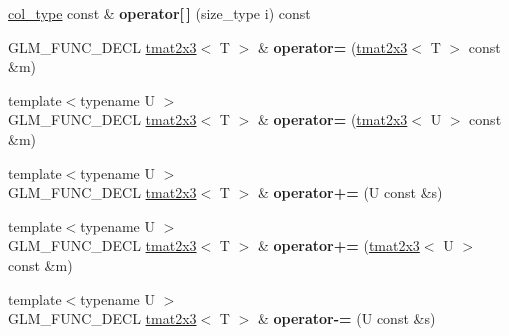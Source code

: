 \begin{DoxyCompactItemize}
\item 
\hypertarget{structglm_1_1detail_1_1tmat2x3_a1008ba45200ec07a341cda897e150d78}{\hyperlink{structglm_1_1detail_1_1tvec3}{col\-\_\-type} const \& {\bfseries operator\mbox{[}$\,$\mbox{]}} (size\-\_\-type i) const }\label{structglm_1_1detail_1_1tmat2x3_a1008ba45200ec07a341cda897e150d78}

\item 
\hypertarget{structglm_1_1detail_1_1tmat2x3_a0d57237fc072d33d7894af60e62a65d4}{G\-L\-M\-\_\-\-F\-U\-N\-C\-\_\-\-D\-E\-C\-L \hyperlink{structglm_1_1detail_1_1tmat2x3}{tmat2x3}$<$ T $>$ \& {\bfseries operator=} (\hyperlink{structglm_1_1detail_1_1tmat2x3}{tmat2x3}$<$ T $>$ const \&m)}\label{structglm_1_1detail_1_1tmat2x3_a0d57237fc072d33d7894af60e62a65d4}

\item 
\hypertarget{structglm_1_1detail_1_1tmat2x3_a452832f7dbdecbaef24e0d225dc16afd}{{\footnotesize template$<$typename U $>$ }\\G\-L\-M\-\_\-\-F\-U\-N\-C\-\_\-\-D\-E\-C\-L \hyperlink{structglm_1_1detail_1_1tmat2x3}{tmat2x3}$<$ T $>$ \& {\bfseries operator=} (\hyperlink{structglm_1_1detail_1_1tmat2x3}{tmat2x3}$<$ U $>$ const \&m)}\label{structglm_1_1detail_1_1tmat2x3_a452832f7dbdecbaef24e0d225dc16afd}

\item 
\hypertarget{structglm_1_1detail_1_1tmat2x3_ae497a8b380033cc76f7774fda52332c7}{{\footnotesize template$<$typename U $>$ }\\G\-L\-M\-\_\-\-F\-U\-N\-C\-\_\-\-D\-E\-C\-L \hyperlink{structglm_1_1detail_1_1tmat2x3}{tmat2x3}$<$ T $>$ \& {\bfseries operator+=} (U const \&s)}\label{structglm_1_1detail_1_1tmat2x3_ae497a8b380033cc76f7774fda52332c7}

\item 
\hypertarget{structglm_1_1detail_1_1tmat2x3_adffac5496f72728cdc390b84852bb7ef}{{\footnotesize template$<$typename U $>$ }\\G\-L\-M\-\_\-\-F\-U\-N\-C\-\_\-\-D\-E\-C\-L \hyperlink{structglm_1_1detail_1_1tmat2x3}{tmat2x3}$<$ T $>$ \& {\bfseries operator+=} (\hyperlink{structglm_1_1detail_1_1tmat2x3}{tmat2x3}$<$ U $>$ const \&m)}\label{structglm_1_1detail_1_1tmat2x3_adffac5496f72728cdc390b84852bb7ef}

\item 
\hypertarget{structglm_1_1detail_1_1tmat2x3_a612df921324d1dfbb66b008110551faa}{{\footnotesize template$<$typename U $>$ }\\G\-L\-M\-\_\-\-F\-U\-N\-C\-\_\-\-D\-E\-C\-L \hyperlink{structglm_1_1detail_1_1tmat2x3}{tmat2x3}$<$ T $>$ \& {\bfseries operator-\/=} (U const \&s)}\label{structglm_1_1detail_1_1tmat2x3_a612df921324d1dfbb66b008110551faa}


\end{DoxyCompactItemize}
